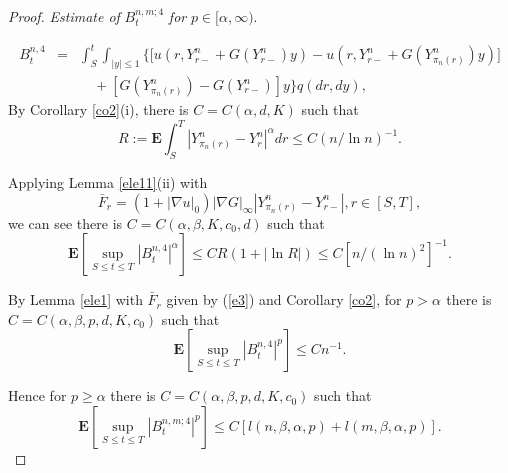 \documentclass[11pt]{amsart}
\theoremstyle{plain}
\numberwithin{equation}{section}
\begin{document}
\begin{proof}
\emph{Estimate of }$B_{t}^{n,m;4}$ \emph{for }$p\in \lbrack \alpha ,\infty
). $

\begin{eqnarray*}
B_{t}^{n,4} &=&\int_{S}^{t}\int_{\left\vert y\right\vert \leq 1}\Big\{\lbrack u\left( r,Y_{r-}^{n}+G\left( Y_{r-}^{n}\right) y\right) -u\left(
r,Y_{r-}^{n}+G\left( Y_{\pi _{n}\left( r\right) }^{n}\right) y\right) ] \\
&&\quad +[G\left( Y_{\pi _{n}\left( r\right) }^{n}\right) -G\left(
Y_{r-}^{n}\right) ]y\Big\}q\left( dr,dy\right) ,
\end{eqnarray*}By Corollary \ref{co2}(i), there is $C=C\left( \alpha ,d,K\right) $ such that\begin{equation*}
R:=\mathbf{E}\int_{S}^{T}\left\vert Y_{\pi _{n}\left( r\right)
}^{n}-Y_{r}^{n}\right\vert ^{\alpha }dr\leq C\left( n/\ln n\right) ^{-1}.
\end{equation*}

Applying Lemma \ref{ele11}(ii) with 
\begin{equation}
\bar{F}_{r}=\left( 1+|\nabla u|_{0}\right) \left\vert \nabla G\right\vert
_{\infty }\left\vert Y_{\pi _{n}\left( r\right) }^{n}-Y_{r-}^{n}\right\vert
,r\in \left[ S,T\right] ,  \label{e3}
\end{equation}we can see there is $C=C\left( \alpha ,\beta ,K,c_{0},d\right) $ such that\begin{equation*}
\mathbf{E}\left[ \sup_{S\leq t\leq T}\left\vert B_{t}^{n,4}\right\vert
^{\alpha }\right] \leq CR\left( 1+\left\vert \ln R\right\vert \right) \leq C\left[ n/\left( \ln n\right) ^{2}\right] ^{-1}.
\end{equation*}

By Lemma \ref{ele1} with $\bar{F}_{r}$ given by (\ref{e3}) and Corollary \ref{co2}, for \thinspace $p>\alpha \,\ $there is $C=C\left( \alpha ,\beta
,p,d,K,c_{0}\right) $ such that\begin{equation*}
\mathbf{E}\left[ \sup_{S\leq t\leq T}\left\vert B_{t}^{n,4}\right\vert ^{p}\right] \leq Cn^{-1}.
\end{equation*}

Hence for $p\geq \alpha $ there is $C=C\left( \alpha ,\beta
,p,d,K,c_{0}\right) $ such that\begin{equation*}
\mathbf{E}\left[ \sup_{S\leq t\leq T}\left\vert B_{t}^{n,m;4}\right\vert ^{p}\right] \leq C\left[ l\left( n,\beta ,\alpha ,p\right) +l\left( m,\beta
,\alpha ,p\right) \right] .
\end{equation*}


\end{proof}
\end{document}
